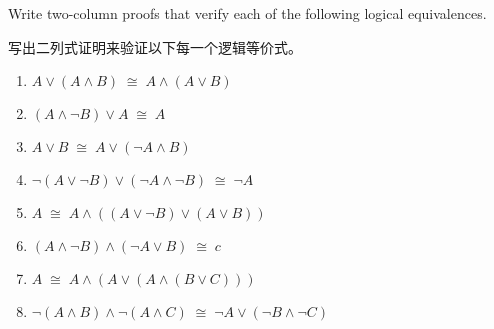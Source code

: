 Write two-column proofs that verify each of the following
logical equivalences.

写出二列式证明来验证以下每一个逻辑等价式。

\begin{enumerate}
\item $A \lor (A \land B) \; \cong \; A \land (A \lor B)$
\medskip

\item $(A \land {\lnot}B) \lor A \; \cong \; A$
\medskip

\item $A \lor B \; \cong \; A \lor ({\lnot}A \land B)$
\medskip

\item ${\lnot}(A \lor {\lnot}B) \lor ({\lnot}A \land {\lnot}B) \; \cong \; {\lnot}A$
\medskip

\item $A \; \cong \; A \land ((A \lor {\lnot}B) \lor (A \lor B))$
\medskip

\item $(A \land {\lnot}B) \land ({\lnot}A \lor B) \; \cong \; c$
\medskip

\item $A \; \cong \; A \land (A \lor (A \land (B \lor C)))$
\medskip

\item ${\lnot}(A \land B) \land {\lnot}(A \land C) \; \cong \; {\lnot}A \lor ({\lnot}B \land {\lnot}C)$
\medskip

\end{enumerate}

\workbookpagebreak

\rule{0pt}{0pt}

\workbookpagebreak